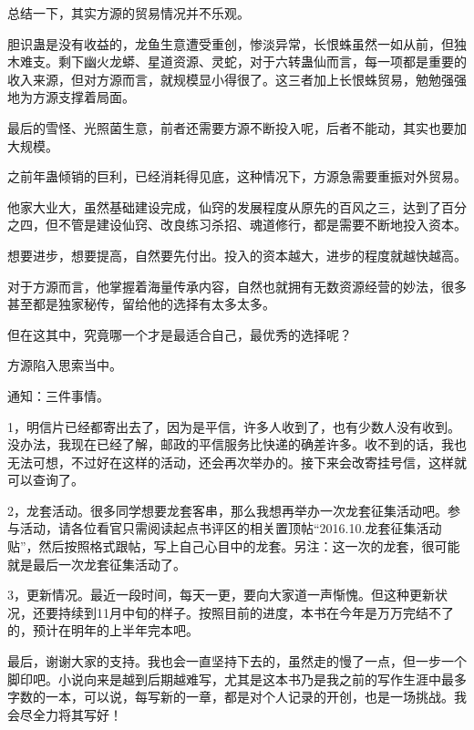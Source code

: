\begin{this_body}
总结一下，其实方源的贸易情况并不乐观。

胆识蛊是没有收益的，龙鱼生意遭受重创，惨淡异常，长恨蛛虽然一如从前，但独木难支。剩下幽火龙蟒、星道资源、灵蛇，对于六转蛊仙而言，每一项都是重要的收入来源，但对方源而言，就规模显小得很了。这三者加上长恨蛛贸易，勉勉强强地为方源支撑着局面。

最后的雪怪、光照菌生意，前者还需要方源不断投入呢，后者不能动，其实也要加大规模。

之前年蛊倾销的巨利，已经消耗得见底，这种情况下，方源急需要重振对外贸易。

他家大业大，虽然基础建设完成，仙窍的发展程度从原先的百风之三，达到了百分之四，但不管是建设仙窍、改良练习杀招、魂道修行，都是需要不断地投入资本。

想要进步，想要提高，自然要先付出。投入的资本越大，进步的程度就越快越高。

对于方源而言，他掌握着海量传承内容，自然也就拥有无数资源经营的妙法，很多甚至都是独家秘传，留给他的选择有太多太多。

但在这其中，究竟哪一个才是最适合自己，最优秀的选择呢？

方源陷入思索当中。

通知：三件事情。

1，明信片已经都寄出去了，因为是平信，许多人收到了，也有少数人没有收到。没办法，我现在已经了解，邮政的平信服务比快递的确差许多。收不到的话，我也无法可想，不过好在这样的活动，还会再次举办的。接下来会改寄挂号信，这样就可以查询了。

2，龙套活动。很多同学想要龙套客串，那么我想再举办一次龙套征集活动吧。参与活动，请各位看官只需阅读起点书评区的相关置顶帖“2016.10.龙套征集活动贴”，然后按照格式跟帖，写上自己心目中的龙套。另注：这一次的龙套，很可能就是最后一次龙套征集活动了。

3，更新情况。最近一段时间，每天一更，要向大家道一声惭愧。但这种更新状况，还要持续到11月中旬的样子。按照目前的进度，本书在今年是万万完结不了的，预计在明年的上半年完本吧。

最后，谢谢大家的支持。我也会一直坚持下去的，虽然走的慢了一点，但一步一个脚印吧。小说向来是越到后期越难写，尤其是这本书乃是我之前的写作生涯中最多字数的一本，可以说，每写新的一章，都是对个人记录的开创，也是一场挑战。我会尽全力将其写好！

\end{this_body}

